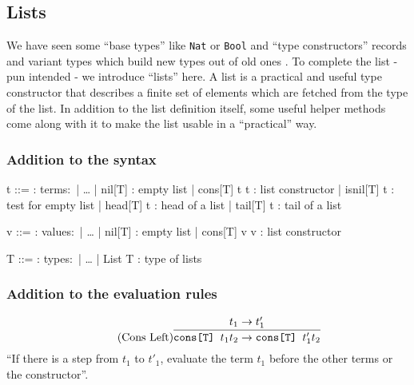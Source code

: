 \subsection{Lists}

We have seen some ``base types'' like \texttt{Nat} or \texttt{Bool}
and ``type constructors'' records and variant types which build
new types out of old ones \cite{pierce2002ProgLang}.
To complete the list - pun intended - we introduce
``lists'' here. A list is a practical and useful type constructor
that describes a finite set of elements which are fetched from the
type of the list.
In addition to the list definition itself, some useful helper
methods come along with it to make the list usable in a ``practical''
way.

\subsubsection{Addition to the syntax \cite{pierce2002ProgLang}}
\begin{bnfgrammar}
    t ::= : terms$\colon$
    | \dots
    | nil[T] : empty list
    | cons[T] t t : list constructor
    | isnil[T] t : test for empty list
    | head[T] t : head of a list
    | tail[T] t : tail of a list
\end{bnfgrammar}\leavevmode\newline

\begin{bnfgrammar}
    v ::= : values$\colon$
    | \dots
    | nil[T] : empty list
    | cons[T] v v : list constructor
\end{bnfgrammar}\leavevmode\newline

\begin{bnfgrammar}
    T ::= : types$\colon$
    | \dots
    | List T : type of lists
\end{bnfgrammar}\leavevmode\newline

\subsubsection{Addition to the evaluation rules \cite{pierce2002ProgLang}}
\begin{equation*}
    \tag{Cons Left}
    \infer{
        \texttt{cons[T] } t_1 t_2 \rightarrow \texttt{cons[T] } t'_1 t_2
    }{
        t_1 \rightarrow t'_1
    }
\end{equation*}
``If there is a step from $t_1$ to $t'_1$, evaluate the term $t_1$
before the other terms or the constructor''.

